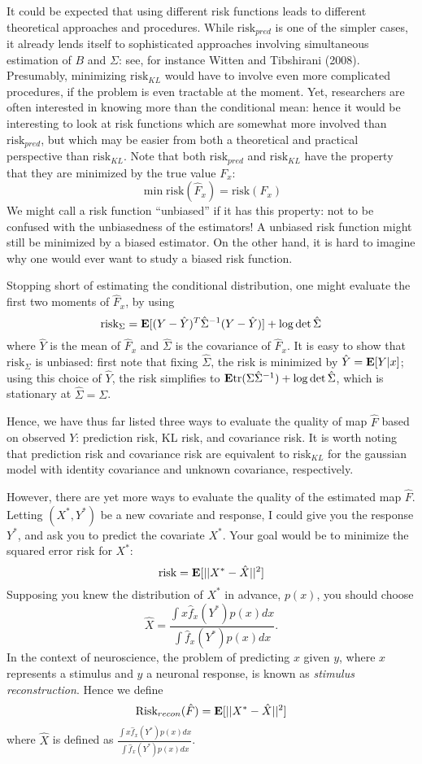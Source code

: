 \documentclass[12pt]{article}
\begin{document}
It could be expected that using different risk functions leads to
different theoretical approaches and procedures.  While
$\text{risk}_{pred}$ is one of the simpler cases, it already lends
itself to sophisticated approaches involving simultaneous estimation
of $B$ and $\Sigma$: see, for instance Witten and Tibshirani (2008).
Presumably, minimizing $\text{risk}_{KL}$ would have to involve even
more complicated procedures, if the problem is even tractable at the
moment.  Yet, researchers are often interested in knowing more than
the conditional mean: hence it would be interesting to look at risk
functions which are somewhat more involved than $\text{risk}_{pred}$,
but which may be easier from both a theoretical and practical
perspective than $\text{risk}_{KL}$.  Note that both
$\text{risk}_{pred}$ and $\text{risk}_{KL}$ have the property that
they are minimized by the true value $F_x$:
\[
\min \text{risk}(\hat{F}_x) = \text{risk}(F_x)
\]
We might call a risk function ``unbiased'' if it has this property:
not to be confused with the unbiasedness of the estimators!  A
unbiased risk function might still be minimized by a biased estimator.
On the other hand, it is hard to imagine why one would ever want to study a
biased risk function.

Stopping short of estimating the conditional distribution, one might
evaluate the first two moments of $\hat{F}_x$, by using
\[
\text{risk}_{\Sigma} = \textbf{E}[(Y - \hat{Y})^T \hat{\Sigma}^{-1} (Y - \hat{Y})] + \log \det \hat{\Sigma}
\]
where $\hat{Y}$ is the mean of $\hat{F}_x$ and $\hat{\Sigma}$ is the
covariance of $\hat{F}_x$. It is easy to show that
$\text{risk}_{\Sigma}$ is unbiased: first note that fixing
$\hat{\Sigma}$, the risk is minimized by $\hat{Y} = \textbf{E}[Y|x]$; using
this choice of $\hat{Y}$, the risk simplifies to
$\textbf{E}\text{tr}(\Sigma\hat{\Sigma}^{-1}) + \log\det\hat{\Sigma}$, which is
stationary at $\hat{\Sigma} = \Sigma$.

Hence, we have thus far listed three ways to evaluate the quality of
map $\hat{F}$ based on observed $Y$: prediction risk, KL risk, and 
covariance risk.
It is worth noting that prediction risk and covariance risk are
equivalent to $\text{risk}_{KL}$ for the gaussian model with identity
covariance and unknown covariance, respectively.

However, there are yet more ways to evaluate the quality of the
estimated map $\hat{F}$.  Letting $(X^*, Y^*)$ be a new covariate and
response, I could give you the response $Y^*$, and ask you to predict the
covariate $X^*$.  Your goal would be to minimize the squared error risk for $X^*$:
\[
\text{risk} = \textbf{E}[||X^* - \hat{X}||^2]
\]
Supposing you knew the distribution of $X^*$ in advance, $p(x)$,
you should choose
\[
\hat{X} = \frac{\int x \hat{f}_x(Y^*) p(x) dx}{\int \hat{f}_x(Y^*) p(x) dx}.
\]
In the context of neuroscience, the problem of predicting $x$ given
$y$, where $x$ represents a stimulus and $y$ a neuronal response, is
known as \emph{stimulus reconstruction}.  Hence we define
\[
\text{Risk}_{recon}(\hat{F}) = \textbf{E}[||X^* - \hat{X}||^2]
\]
where $\hat{X}$ is defined as $\frac{\int x \hat{f}_x(Y^*) p(x)
dx}{\int \hat{f}_x(Y^*) p(x) dx}$.
\end{document}

